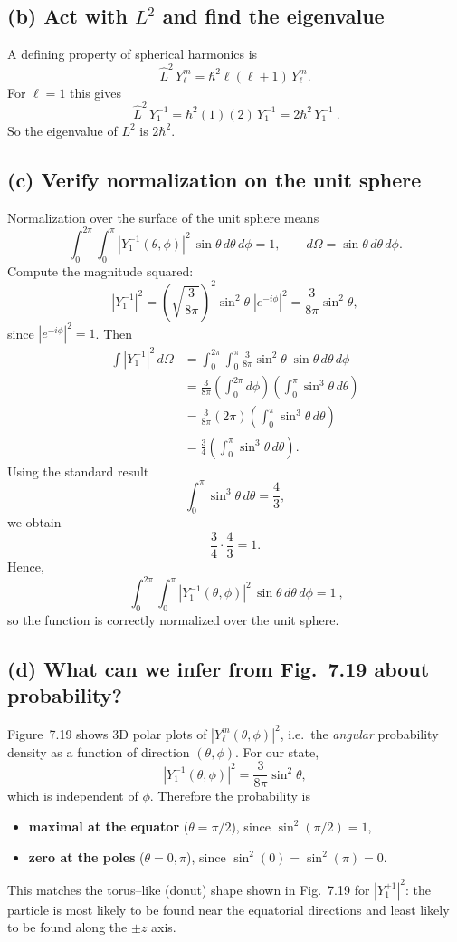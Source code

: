 \documentclass{article}
\begin{document}
\subsection*{(b) Act with $L^2$ and find the eigenvalue}

A defining property of spherical harmonics is
\[
\hat L^2\,Y_\ell^{m}=\hbar^2\ell(\ell+1)\,Y_\ell^{m}.
\]
For $\ell=1$ this gives
\[
\boxed{\ \hat L^2\,Y_1^{-1}= \hbar^2(1)(2)\,Y_1^{-1}=2\hbar^2\,Y_1^{-1}\ }.
\]
So the eigenvalue of $L^2$ is $2\hbar^2$.

\subsection*{(c) Verify normalization on the unit sphere}

Normalization over the surface of the unit sphere means
\[
\int_0^{2\pi}\int_0^\pi |Y_1^{-1}(\theta,\phi)|^2\,\sin\theta\,d\theta\,d\phi = 1,
\qquad d\Omega=\sin\theta\,d\theta\,d\phi.
\]
Compute the magnitude squared:
\[
|Y_1^{-1}|^2
=
\left(\sqrt{\frac{3}{8\pi}}\right)^2
\sin^2\theta\;|e^{-i\phi}|^2
=
\frac{3}{8\pi}\sin^2\theta,
\]
since $|e^{-i\phi}|^2=1$. Then
\begin{align*}
\int |Y_1^{-1}|^2\,d\Omega
&=
\int_0^{2\pi}\int_0^\pi
\frac{3}{8\pi}\sin^2\theta\;\sin\theta\,d\theta\,d\phi\\[4pt]
&=
\frac{3}{8\pi}\left(\int_0^{2\pi}d\phi\right)
\left(\int_0^\pi \sin^3\theta\,d\theta\right)\\[4pt]
&=
\frac{3}{8\pi}(2\pi)\left(\int_0^\pi \sin^3\theta\,d\theta\right)\\[4pt]
&=
\frac{3}{4}\left(\int_0^\pi \sin^3\theta\,d\theta\right).
\end{align*}
Using the standard result
\[
\int_0^\pi \sin^3\theta\,d\theta=\frac{4}{3},
\]
we obtain
\[
\frac{3}{4}\cdot\frac{4}{3}=1.
\]
Hence,
\[
\boxed{\ \int_0^{2\pi}\int_0^\pi |Y_1^{-1}(\theta,\phi)|^2\,\sin\theta\,d\theta\,d\phi = 1\ },
\]
so the function is correctly normalized over the unit sphere.

\subsection*{(d) What can we infer from Fig.~7.19 about probability?}

Figure~7.19 shows 3D polar plots of $|Y_\ell^m(\theta,\phi)|^2$, i.e.\ the \emph{angular}
probability density as a function of direction $(\theta,\phi)$.  For our state,
\[
|Y_1^{-1}(\theta,\phi)|^2=\frac{3}{8\pi}\sin^2\theta,
\]
which is independent of $\phi$. Therefore the probability is
\begin{itemize}
\item \textbf{maximal at the equator} ($\theta=\pi/2$), since $\sin^2(\pi/2)=1$,
\item \textbf{zero at the poles} ($\theta=0,\pi$), since $\sin^2(0)=\sin^2(\pi)=0$.
\end{itemize}
This matches the torus--like (donut) shape shown in Fig.~7.19 for $|Y_1^{\pm 1}|^2$:
the particle is most likely to be found near the equatorial directions and least likely
to be found along the $\pm z$ axis.
\end{document}
